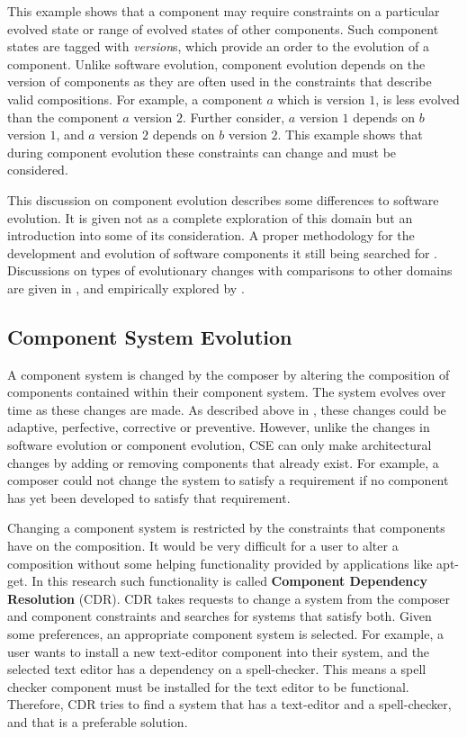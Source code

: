 This example shows that a component may require constraints on a particular evolved state or range of evolved states of other components.
Such component states are tagged with \textit{version}s, which provide an order to the evolution of a component.
Unlike software evolution, component evolution depends on the version of components as they are often used in the constraints that describe valid compositions.
For example, a component $a$ which is version $1$, is less evolved than the component $a$ version $2$.
Further consider, $a$ version $1$ depends on $b$ version $1$, and $a$ version $2$ depends on $b$ version $2$.
This example shows that during component evolution these constraints can change and must be considered.

This discussion on component evolution describes some differences to software evolution.
It is given not as a complete exploration of this domain but an introduction into some of its consideration. 
A proper methodology for the development and evolution of software components it still being searched for \citep{Szyperski2002}.
Discussions on types of evolutionary changes with comparisons to other domains are given in \citep{Papazoglou2011},
and empirically explored by \cite{vasa2007patterns}.

\subsection{Component System Evolution}
A component system is changed by the composer by altering the composition of components contained within their component system.
The system evolves over time as these changes are made.
As described above in \citep{IsoIec2006}, these changes could be adaptive, perfective, corrective or preventive.
However, unlike the changes in software evolution or component evolution, CSE can only make architectural changes by adding or removing components that already exist.
For example, a composer could not change the system to satisfy a requirement if no component has yet been developed to satisfy that requirement.

Changing a component system is restricted by the constraints that components have on the composition. 
It would be very difficult for a user to alter a composition without some helping functionality provided by applications like apt-get.
In this research such functionality is called  \textbf{Component Dependency Resolution} (CDR).
CDR takes requests to change a system from the composer and component constraints and searches for systems that satisfy both.
Given some preferences, an appropriate component system is selected.
For example, a user wants to install a new text-editor component into their system, and the selected text editor has a dependency on a spell-checker.
This means a spell checker component must be installed for the text editor to be functional. 
Therefore, CDR tries to find a system that has a text-editor and a spell-checker, and that is a preferable solution.

